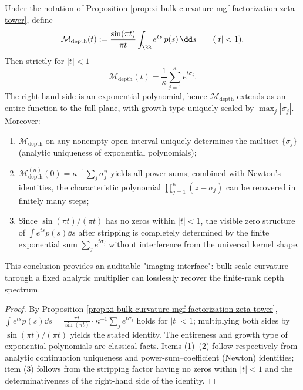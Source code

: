 \begin{proposition}\label{prop:xi-gamma-stripped-depth-spectrum-imaging}
Under the notation of Proposition \ref{prop:xi-bulk-curvature-mgf-factorization-zeta-tower}, define
\[
\mathcal M_{\mathrm{depth}}(t):=\frac{\sin(\pi t)}{\pi t}\int_{\RR}e^{ts}\,p(s)\,\dd s\qquad(|t|<1).
\]
Then strictly for \(|t|<1\)
\[
\boxed{\;
\mathcal M_{\mathrm{depth}}(t)=\frac{1}{\kappa}\sum_{j=1}^{\kappa}e^{t\sigma_j}.\;}
\]
The right-hand side is an exponential polynomial, hence \(\mathcal M_{\mathrm{depth}}\) extends as an entire function to the full plane, with growth type uniquely sealed by \(\max_j|\sigma_j|\).
Moreover:
\begin{enumerate}
  \item \(\mathcal M_{\mathrm{depth}}\) on any nonempty open interval uniquely determines the multiset \(\{\sigma_j\}\) (analytic uniqueness of exponential polynomials);
  \item \(\mathcal M_{\mathrm{depth}}^{(n)}(0)=\kappa^{-1}\sum_{j}\sigma_j^{n}\) yields all power sums; combined with Newton's identities, the characteristic polynomial \(\prod_{j=1}^{\kappa}(z-\sigma_j)\) can be recovered in finitely many steps;
  \item Since \(\sin(\pi t)/(\pi t)\) has no zeros within \(|t|<1\), the visible zero structure of \(\int e^{ts}p(s)\dd s\) after stripping is completely determined by the finite exponential sum \(\sum_j e^{t\sigma_j}\) without interference from the universal kernel shape.
\end{enumerate}
This conclusion provides an auditable "imaging interface": bulk scale curvature through a fixed analytic multiplier can losslessly recover the finite-rank depth spectrum.
\end{proposition}
\begin{proof}
By Proposition \ref{prop:xi-bulk-curvature-mgf-factorization-zeta-tower},
\(
\int e^{ts}p(s)\dd s=\frac{\pi t}{\sin(\pi t)}\cdot \kappa^{-1}\sum_j e^{t\sigma_j}
\)
holds for \(|t|<1\); multiplying both sides by \(\sin(\pi t)/(\pi t)\) yields the stated identity.
The entireness and growth type of exponential polynomials are classical facts.
Items (1)--(2) follow respectively from analytic continuation uniqueness and power-sum--coefficient (Newton) identities;
item (3) follows from the stripping factor having no zeros within \(|t|<1\) and the determinativeness of the right-hand side of the identity.
\end{proof}

